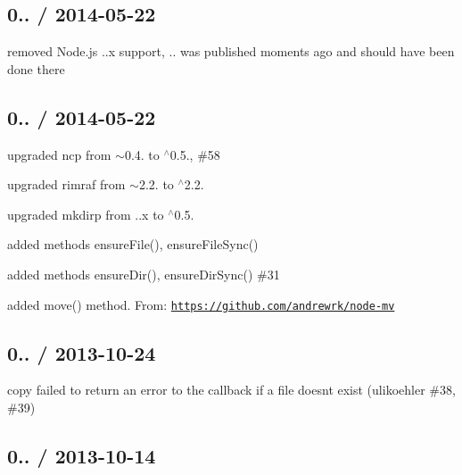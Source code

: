 \subsection*{0.. / 2014-\/05-\/22 }


\begin{DoxyItemize}
\item removed Node.\+js {..\+x} support, {..} was published moments ago and should have been done there
\end{DoxyItemize}

\subsection*{0.. / 2014-\/05-\/22 }


\begin{DoxyItemize}
\item upgraded {\ttfamily ncp} from {\ttfamily $\sim$0.4.} to {\ttfamily $^\wedge$0.5.}, \#58
\item upgraded {\ttfamily rimraf} from {\ttfamily $\sim$2.2.} to {\ttfamily $^\wedge$2.2.}
\item upgraded {\ttfamily mkdirp} from {..\+x} to {\ttfamily $^\wedge$0.5.}
\item added methods {\ttfamily ensure\+File()}, {\ttfamily ensure\+File\+Sync()}
\item added methods {\ttfamily ensure\+Dir()}, {\ttfamily ensure\+Dir\+Sync()} \#31
\item added {\ttfamily move()} method. From\+: \href{https://github.com/andrewrk/node-mv}{\tt https\+://github.\+com/andrewrk/node-\/mv}
\end{DoxyItemize}

\subsection*{0.. / 2013-\/10-\/24 }


\begin{DoxyItemize}
\item copy failed to return an error to the callback if a file doesn\textquotesingle{}t exist (ulikoehler \#38, \#39)
\end{DoxyItemize}

\subsection*{0.. / 2013-\/10-\/14 }


